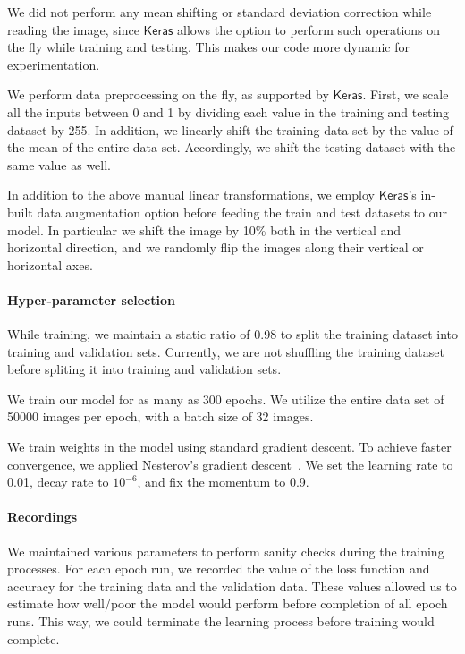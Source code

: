 \documentclass[]{article}
\newcommand*{\keras}{\ensuremath{\mathsf{Keras}}}
\begin{document}
We did not perform any mean shifting or standard deviation correction while reading the image, since $\keras$ allows the option to perform such operations on the fly while training and testing. This makes our code more dynamic for experimentation. 

We perform data preprocessing on the fly, as supported by $\keras$. First, we scale all the inputs between 0 and 1 by dividing each value in the training and testing dataset by 255.  In addition, we linearly shift the training data set by the value of the mean of the entire data set. Accordingly, we shift the  testing dataset with the same value as well. 

In addition to the above manual linear transformations,  we employ $\keras$'s in-built data augmentation option before feeding the train and test datasets to our model. In particular we shift the image by 10\% both in the vertical and horizontal direction, and we randomly flip the images along their vertical or horizontal axes. 


\paragraph{Hyper-parameter selection}
While training, we maintain a static ratio of 0.98 to split the training dataset into training and validation sets.  Currently, we are not shuffling the training dataset before spliting it into training and validation sets. 

We train our model for as many as 300 epochs. We utilize the entire data set of 50000 images per epoch, with a batch size of 32 images. 

We train weights in the model using standard gradient descent. To achieve faster convergence, we applied Nesterov's gradient descent~\cite{nesterov2012efficiency}. We set the learning rate to 0.01, decay rate to $10^{-6}$, and fix the momentum to 0.9. 


\paragraph{Recordings}
We maintained various parameters to perform sanity checks during the training processes. For each epoch run, we recorded the value of the loss function and accuracy for the training data and the validation data.  These values allowed us to estimate how well/poor the model would perform before completion of all epoch runs. This way, we could terminate the learning process before training would complete. 
\end{document}
